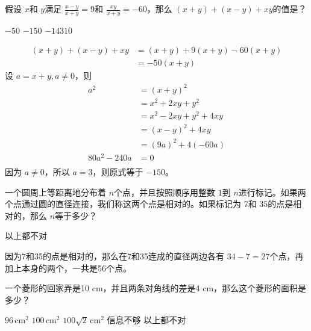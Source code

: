 \begin{questions}
	\question 假设 \( x \)和 \( y \)满足 \( \frac{x-y}{x+y}=9 \)和 \( \frac{xy}{x+y}=-60 \)，那么 \( (x+y) + (x-y) + xy
	\)的值是？

	\begin{oneparchoices}
		\choice \( -50 \) \CorrectChoice \( -150 \) \choice \( -14310 \)  
	\end{oneparchoices}

	\begin{solution}
		\begin{align*}
			(x+y) + (x-y) + xy & = (x+y) + 9(x+y) -60(x+y) \\
			                   & = -50(x+y)
		\end{align*}
		设 \( a = x + y, a \ne 0 \)，则
		\begin{align*}
			a^2         & = (x+y)^2              \\
			            & = x^2 + 2xy + y^2      \\
			            & = x^2 - 2xy + y^2 +4xy \\
			            & = (x-y)^2 + 4xy        \\
			            & = (9a)^2 + 4(-60a)     \\
			80a^2 -240a & = 0                    \\
		\end{align*}
		因为 \( a \ne 0 \)，所以 \( a = 3 \)，则原式等于 \( -150 \)。
	\end{solution}

	\question 一个圆周上等距离地分布着 \( n \)个点，并且按照顺序用整数 \( 1 \)到 \( n
	\)进行标记。如果两个点通过圆的直径连接，我们称这两个点是相对的。如果标记为 \( 7 \)和 \( 35 \)的点是相对的，那么 \( n \)等于多少？

	\begin{oneparchoices}
		    \choice 以上都不对
	\end{oneparchoices}

	\begin{solution}
		因为7和35的点是相对的，那么在7和35连成的直径两边各有 \( 34 - 7 = 27 \)个点，再加上本身的两个，一共是56个点。
	\end{solution}

	\question 一个菱形的回家弄是10 cm，并且两条对角线的差是4 cm，那么这个菱形的面积是多少？

	\begin{oneparchoices}
		\CorrectChoice \( 96\, \text{cm}^2 \) \choice \( 100\, \text{cm}^2 \) \choice \( 100\sqrt{2}\, \text{cm}^2 \) \choice
		信息不够 \choice 以上都不对
	\end{oneparchoices}


\end{questions}
